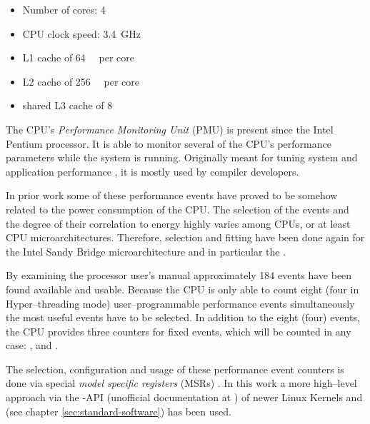 \begin{itemize}

\item Number of cores: 4

\item CPU clock speed: \SI{3.4}{\giga\hertz}

\item L1 cache of \SI{64}{\kibi\byte} per core\cite{intel2011softdev1}

\item L2 cache of \SI{256}{\kibi\byte} per core\cite{intel2011softdev1}

\item shared L3 cache of \SI{8}{\mebi\byte}\cite{intel2011softdev1}

\end{itemize}


\label{sec:pmu}

The CPU's \emph{Performance Monitoring Unit} (PMU) is present since the
Intel\TReg{} Pentium processor. It is able to monitor several of the
CPU's performance parameters while the system is running. Originally meant for
tuning system and application performance \cite{intel2011softdev3b}, it is
mostly used by compiler developers.

In prior work \cite{bellosa2000benefits,snowdon2010operating,
weissel2002process,kellner03tempcontrol,bertran2010decomposable} some of these
performance events have proved to be somehow related to the power consumption of
the CPU. The selection of the events and the degree of their correlation to
energy highly varies among CPUs, or at least CPU microarchitectures. Therefore,
selection and fitting have been done again for the Intel\TReg{} San\-dy Bridge
microarchitecture and in particular the \JWPcpu{}.

By examining the processor user's manual \cite{intel2011events} approximately
184 events have been found available and usable. Because the CPU is only able to
count eight (four in Hyper--threading \cite{HT} mode) user--programmable
performance events simultaneously \cite{intel2011softdev1} the most useful
events have to be selected. In addition to the eight (four) events, the CPU
provides three counters for fixed events, which will be counted in any case:
,  and
.

The selection, configuration and usage of these performance event counters is
done via special \emph{model specific registers} (MSRs)
\cite{intel2011softdev3b}. In this work a more high--level approach via the
-API (unofficial documentation at
\cite{weaver2011perfevents}) of newer Linux Kernels and \JWTlibpfm{} (see
chapter \ref{sec:standard-software}) has been used.


